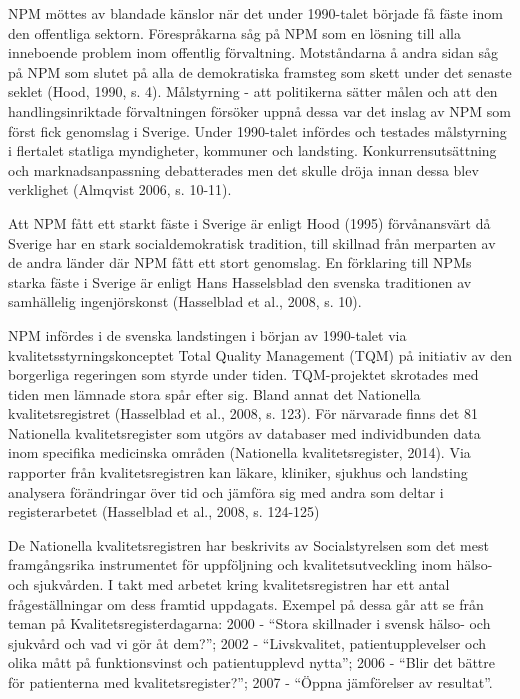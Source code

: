NPM möttes av blandade känslor när det under 1990-talet började få fäste inom den offentliga sektorn. Förespråkarna såg på NPM som en lösning till alla inneboende problem inom offentlig förvaltning. Motståndarna å andra sidan såg på NPM som slutet på alla de demokratiska framsteg som skett under det senaste seklet (Hood, 1990, s. 4). Målstyrning - att politikerna sätter målen och att den handlingsinriktade förvaltningen försöker uppnå dessa var det inslag av NPM som först fick genomslag i Sverige. Under 1990-talet infördes och testades målstyrning i flertalet statliga myndigheter, kommuner och landsting. Konkurrensutsättning och marknadsanpassning debatterades men det skulle dröja innan dessa blev verklighet (Almqvist 2006, s. 10-11).
 
Att NPM fått ett starkt fäste i Sverige är enligt Hood (1995) förvånansvärt då Sverige har en stark socialdemokratisk tradition, till skillnad från merparten av de andra länder där NPM fått ett stort genomslag. En förklaring till NPMs starka fäste i Sverige är enligt Hans Hasselsblad den svenska traditionen av samhällelig ingenjörskonst (Hasselblad et al., 2008, s. 10).
 
NPM infördes i de svenska landstingen i början av 1990-talet via kvalitetsstyrningskonceptet Total Quality Management (TQM) på initiativ av den borgerliga regeringen som styrde under tiden. TQM-projektet skrotades med tiden men lämnade stora spår efter sig. Bland annat det Nationella kvalitetsregistret (Hasselblad et al., 2008, s. 123). För närvarade finns det 81 Nationella kvalitetsregister som utgörs av databaser med individbunden data inom specifika medicinska områden (Nationella kvalitetsregister, 2014). Via rapporter från kvalitetsregistren kan läkare, kliniker, sjukhus och landsting analysera förändringar över tid och jämföra sig med andra som deltar i registerarbetet (Hasselblad et al., 2008, s. 124-125)

De Nationella kvalitetsregistren har beskrivits av Socialstyrelsen som det mest framgångsrika instrumentet för uppföljning och kvalitetsutveckling inom hälso- och sjukvården. I takt med arbetet kring kvalitetsregistren har ett antal frågeställningar om dess framtid uppdagats. Exempel på dessa går att se från teman på Kvalitetsregisterdagarna: 2000 - “Stora skillnader i svensk hälso- och sjukvård och vad vi gör åt dem?”; 2002 - “Livskvalitet, patientupplevelser och olika mått på funktionsvinst och patientupplevd nytta”; 2006 - “Blir det bättre för patienterna med kvalitetsregister?”; 2007 - “Öppna jämförelser av resultat”.

